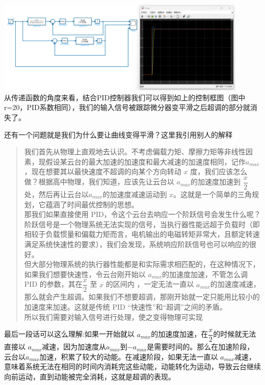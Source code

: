 \documentclass[UTF8,a4paper,12pt]{ctexart}
\begin{document}
             \begin{flushleft}
              
            \par \includegraphics[width=12cm]{picture/tracking_differentiator_pid.png}\\
            从传递函数的角度来看，结合PID控制器我们可以得到如上的控制框图（图中r=20，PID系数相同），我们的输入信号被跟踪微分器变平滑之后超调的部分就消失了。
            \end{flushleft}
            还有一个问题就是我们为什么要让曲线变得平滑？这里我引用别人的解释
            \begin{notitlebox}
              
              \begin{quotation}
                我们首先从物理上直观地去认识。不考虑偏载力矩、摩擦力矩等非线性因素，现假设某云台的最大加速的加速度和最大减速的加速度相同，记作$ a_{max}$，现在想要其以最快速度不超调的向某个方向转动 $x$ 度，我们应该怎么做？根据高中物理，我们知道，应该先让云台以 $a_{max}$的加速度加速到 $\dfrac{x}{2}$处，然后再让云台以$a_{max}$的加速度减速运动到 $x$。这就是一个简单的三角规划，它蕴涵了时间最优控制的思想。
                \\\indent 那我们如果直接使用 PID，令这个云台去响应一个阶跃信号会发生什么呢？阶跃信号是一个物理系统无法实现的信号，当执行器性能远超于负载时（即相较于负载惯量和偏载力矩而言，电机输出的电磁转矩非常大，且额定转速满足系统快速性的要求），我们会发现，系统响应阶跃信号也可以响应的很好。
                \\\indent 但大部分物理系统的执行器性能都是和实际需求相匹配的，在这种情况下，如果我们想要快速性，令云台刚开始以 $a_{max}$的加速度加速，不管怎么调 PID 的参数，其在$\dfrac{x}{2}$ 至 $x$ 的区间内 ，一定无法一直以 $a_{max}$的加速度减速，那么就会产生超调。如果我们不想要超调，那刚开始就一定只能用比较小的加速度来加速。这就是传统 PID “快速性”和“超调”之间的矛盾。
                \\ \indent 所以我们需要对输入信号进行处理，使之变得物理可实现
              \end{quotation}
            
            \end{notitlebox}
             \begin{flushleft}
              最后一段话可以这么理解:如果一开始就以 $a_{max}$的加速度加速，在$\dfrac{x}{2}$的时候就无法直接以 $a_{max}$减速，因为加速度从$a_{max}$到$-a_{max}$是需要时间的。那么在加速阶段，云台以$a_{max}$加速，积累了较大的动能。在减速阶段，如果无法一直以 $a_{max}$减速，意味着系统无法在相同的时间内消耗完这些动能，动能转化为运动，导致云台继续向前运动，直到动能被完全消耗，这就是超调的表现。
             \end{flushleft}
\end{document}

